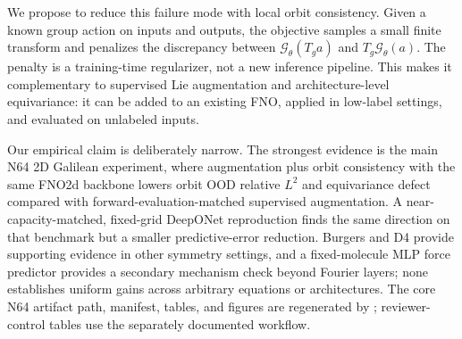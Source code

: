 \documentclass[10pt]{article}
\begin{document}
We propose to reduce this failure mode with local orbit consistency. Given a known group action on inputs and outputs, the objective samples a small finite transform and penalizes the discrepancy between \(\mathcal G_\theta(T_g a)\) and \(T_g\mathcal G_\theta(a)\). The penalty is a training-time regularizer, not a new inference pipeline. This makes it complementary to supervised Lie augmentation and architecture-level equivariance: it can be added to an existing FNO, applied in low-label settings, and evaluated on unlabeled inputs.

Our empirical claim is deliberately narrow. The strongest evidence is the main N64 2D Galilean experiment, where augmentation plus orbit consistency with the same FNO2d backbone lowers orbit OOD relative \(L^2\) and equivariance defect compared with forward-evaluation-matched supervised augmentation. A near-capacity-matched, fixed-grid DeepONet reproduction finds the same direction on that benchmark but a smaller predictive-error reduction. Burgers and D4 provide supporting evidence in other symmetry settings, and a fixed-molecule MLP force predictor provides a secondary mechanism check beyond Fourier layers; none establishes uniform gains across arbitrary equations or architectures. The core N64 artifact path, manifest, tables, and figures are regenerated by ; reviewer-control tables use the separately documented  workflow.








\clearpage


\end{document}
